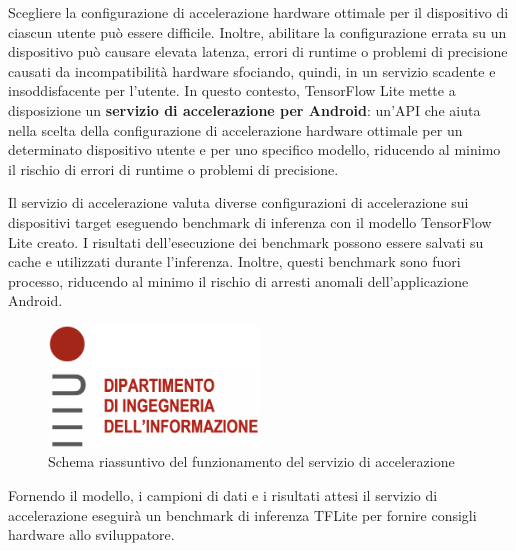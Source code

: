 Scegliere la configurazione di accelerazione hardware ottimale per il dispositivo di ciascun utente può essere difficile. Inoltre, abilitare la
configurazione errata su un dispositivo può causare elevata latenza, errori di runtime o problemi di precisione causati da incompatibilità hardware
sfociando, quindi, in un servizio scadente e insoddisfacente per l’utente. In questo contesto, TensorFlow Lite mette a disposizione un \textbf{servizio di
accelerazione per Android}: un'API che aiuta nella scelta della configurazione di accelerazione hardware ottimale per un determinato dispositivo utente e
per uno specifico modello, riducendo al minimo il rischio di errori di runtime o problemi di precisione.

Il servizio di accelerazione valuta diverse configurazioni di accelerazione sui dispositivi target eseguendo benchmark di inferenza con il modello
TensorFlow Lite creato. I risultati dell’esecuzione dei benchmark possono essere salvati su cache e utilizzati durante l’inferenza. Inoltre, questi
benchmark sono fuori processo, riducendo al minimo il rischio di arresti anomali dell’applicazione Android.

\begin{figure}
    \centering
    \includegraphics[width=0.5\textwidth]{Immagini/logo_dei.png}
    \caption{Schema riassuntivo del funzionamento del servizio di accelerazione}
    \label{fig:accelerazione}
\end{figure}

Fornendo il  modello, i campioni di dati e i risultati attesi il servizio di accelerazione eseguirà un benchmark di inferenza TFLite per fornire
consigli hardware allo sviluppatore.

